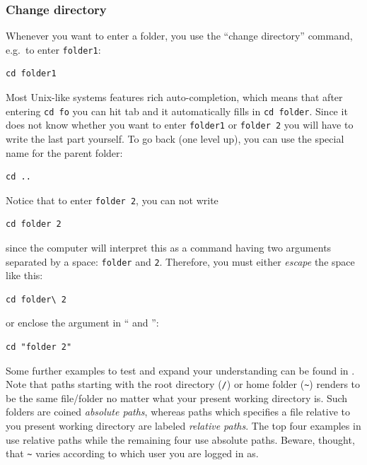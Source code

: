 \subsubsection{Change directory}
Whenever you want to enter a folder, you use the ``change directory'' command, e.g.\ to enter \verb|folder1|:

\begin{verbatim}
cd folder1
\end{verbatim}
Most Unix-like systems features rich auto-completion, which means that after entering \verb|cd fo| you can hit tab and it automatically fills in \verb|cd folder|. Since it does not know whether you want to enter \verb|folder1| or \verb|folder 2| you will have to write the last part yourself. To go back (one level up), you can use the special name for the parent folder:

\begin{verbatim}
cd ..
\end{verbatim}

Notice that to enter \verb|folder 2|, you can not write

\begin{verbatim}
cd folder 2
\end{verbatim}
since the computer will interpret this as a command having two arguments separated by a space: \verb|folder| and \verb|2|. Therefore, you must either \emph{escape} the space like this:

\begin{verbatim}
cd folder\ 2
\end{verbatim}
or enclose the argument in `` and '':

\begin{verbatim}
cd "folder 2"
\end{verbatim}

Some further examples to test and expand your understanding can be found in . Note that paths starting with the root directory (\verb|/|) or home folder (\verb|~|) renders to be the same file/folder no matter what your present working directory is. Such folders are coined \emph{absolute paths}, whereas paths which specifies a file relative to you present working directory are labeled \emph{relative paths}. The top four examples in  use relative paths while the remaining four use absolute paths. Beware, thought, that \verb|~| varies according to which user you are logged in as.

